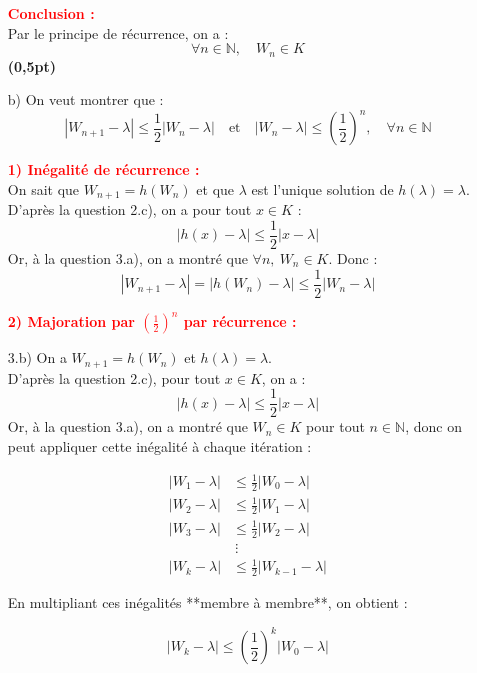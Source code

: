 \documentclass[12pt]{article}
\begin{document}
\begin{enumerate}
\textcolor{red}{\textbf{Conclusion :}}\\
Par le principe de récurrence, on a :
\[
\forall n \in \mathbb{N},\quad W_n \in K
\]
\hfill \textbf{(0,5pt)}

\item[b)] On veut montrer que :
\[
|W_{n+1} - \lambda| \leq \frac{1}{2}|W_n - \lambda| \quad \text{et} \quad |W_n - \lambda| \leq \left( \frac{1}{2} \right)^n, \quad \forall n \in \mathbb{N}
\]

\textcolor{red}{\textbf{1) Inégalité de récurrence :}}\\
On sait que \( W_{n+1} = h(W_n) \) et que \( \lambda \) est l’unique solution de \( h(\lambda) = \lambda \).\\
D’après la question 2.c), on a pour tout \( x \in K \) :
\[
|h(x) - \lambda| \leq \frac{1}{2} |x - \lambda|
\]
Or, à la question 3.a), on a montré que \( \forall n, \ W_n \in K \). Donc :
\[
|W_{n+1} - \lambda| = |h(W_n) - \lambda| \leq \frac{1}{2} |W_n - \lambda|
\]

\textcolor{red}{\textbf{2) Majoration par \( \left( \frac{1}{2} \right)^n \) par récurrence :}}\\

\item[3.b)] On a \( W_{n+1} = h(W_n) \) et \( h(\lambda) = \lambda \).\\
D’après la question 2.c), pour tout \( x \in K \), on a :
\[
|h(x) - \lambda| \leq \frac{1}{2} |x - \lambda|
\]
Or, à la question 3.a), on a montré que \( W_n \in K \) pour tout \( n \in \mathbb{N} \), donc on peut appliquer cette inégalité à chaque itération :

\begin{equation*}
\begin{aligned}
|W_{1} - \lambda| &\leq \frac{1}{2} |W_0 - \lambda| \\
|W_{2} - \lambda| &\leq \frac{1}{2} |W_1 - \lambda| \\
|W_{3} - \lambda| &\leq \frac{1}{2} |W_2 - \lambda| \\
&\ \vdots \\
|W_k - \lambda| &\leq \frac{1}{2} |W_{k-1} - \lambda|
\end{aligned}
\end{equation*}

En multipliant ces inégalités **membre à membre**, on obtient :

\begin{equation*}
|W_k - \lambda| \leq \left( \frac{1}{2} \right)^k |W_0 - \lambda|
\end{equation*}


\end{enumerate}
\end{document}
